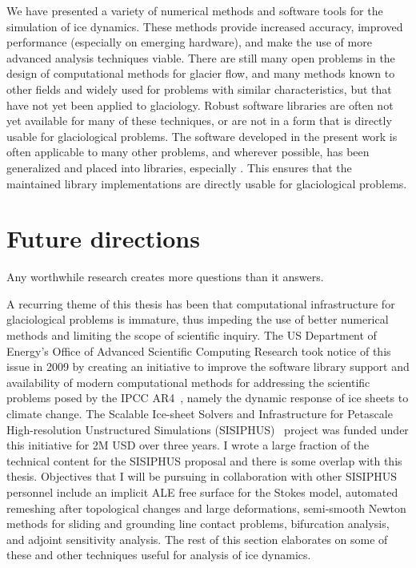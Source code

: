 We have presented a variety of numerical methods and software tools for the simulation of ice dynamics.
These methods provide increased accuracy, improved performance (especially on emerging hardware), and make the use of more advanced analysis techniques viable.
There are still many open problems in the design of computational methods for glacier flow, and many methods known to other fields and widely used for problems with similar characteristics, but that have not yet been applied to glaciology.
Robust software libraries are often not yet available for many of these techniques, or are not in a form that is directly usable for glaciological problems.
The software developed in the present work is often applicable to many other problems, and wherever possible, has been generalized and placed into libraries, especially {\PETSc}.
This ensures that the maintained library implementations are directly usable for glaciological problems.

\section{Future directions}
Any worthwhile research creates more questions than it answers.

A recurring theme of this thesis has been that computational infrastructure for glaciological problems is immature, thus impeding the use of better numerical methods and limiting the scope of scientific inquiry.
The US Department of Energy's Office of Advanced Scientific Computing Research took notice of this issue in 2009 by creating an initiative to improve the software library support and availability of modern computational methods for addressing the scientific problems posed by the IPCC AR4~\citep{lemk2007ar4wg1}, namely the dynamic response of ice sheets to climate change.
The Scalable Ice-sheet Solvers and Infrastructure for Petascale High-resolution Unstructured Simulations (SISIPHUS)~\citep*{sisiphus-web} project was funded under this initiative for 2M USD over three years.
I wrote a large fraction of the technical content for the SISIPHUS proposal and there is some overlap with this thesis.
Objectives that I will be pursuing in collaboration with other SISIPHUS personnel include an implicit ALE free surface for the Stokes model, automated remeshing after topological changes and large deformations, semi-smooth Newton methods for sliding and grounding line contact problems, bifurcation analysis, and adjoint sensitivity analysis.
The rest of this section elaborates on some of these and other techniques useful for analysis of ice dynamics.

